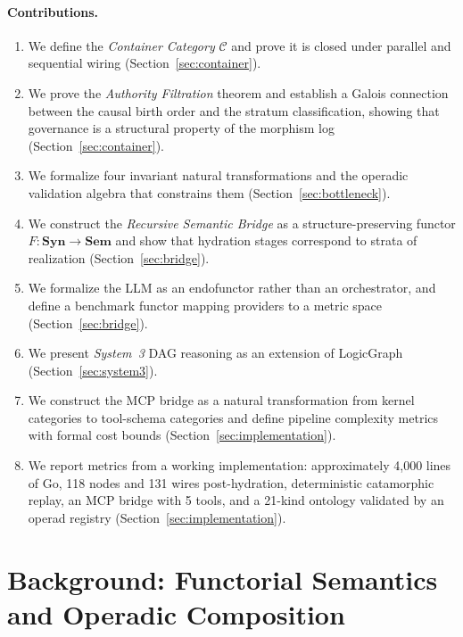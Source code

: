 \documentclass[submission,copyright,creativecommons]{eptcs}
\begin{document}
\paragraph{Contributions.}
\begin{enumerate}
  \item We define the \emph{Container Category} $\mathcal{C}$ and prove it is
        closed under parallel and sequential wiring (Section~\ref{sec:container}).
  \item We prove the \emph{Authority Filtration} theorem and establish a
        Galois connection between the causal birth order and the stratum
        classification, showing that governance is a structural property of
        the morphism log (Section~\ref{sec:container}).
  \item We formalize four invariant natural transformations and the operadic
        validation algebra that constrains them (Section~\ref{sec:bottleneck}).
  \item We construct the \emph{Recursive Semantic Bridge} as a
        structure-preserving functor $F\colon \mathbf{Syn} \to \mathbf{Sem}$
        and show that hydration stages correspond to strata of realization
        (Section~\ref{sec:bridge}).
  \item We formalize the LLM as an endofunctor rather than an orchestrator,
        and define a benchmark functor mapping providers to a metric space
        (Section~\ref{sec:bridge}).
  \item We present \emph{System~3} DAG reasoning as an extension of
        LogicGraph \cite{logicgraph2025} (Section~\ref{sec:system3}).
  \item We construct the MCP bridge as a natural transformation from kernel
        categories to tool-schema categories and define pipeline complexity
        metrics with formal cost bounds (Section~\ref{sec:implementation}).
  \item We report metrics from a working implementation: approximately 4{,}000
        lines of Go, 118 nodes and 131 wires post-hydration, deterministic
        catamorphic replay, an MCP bridge with 5 tools, and a 21-kind ontology
        validated by an operad registry (Section~\ref{sec:implementation}).
\end{enumerate}

\section{Background: Functorial Semantics and Operadic Composition}
\label{sec:background}
\end{document}
